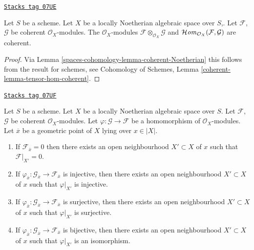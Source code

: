 \begin{lemma}
\label{spaces-cohomology-lemma-tensor-hom-coherent}
\href{https://stacks.math.columbia.edu/tag/07UE}{\texttt{Stacks tag 07UE}}

Let $S$ be a scheme.
Let $X$ be a locally Noetherian algebraic space over $S$,.
Let $\mathcal{F}$, $\mathcal{G}$ be coherent $\mathcal{O}_X$-modules.
The $\mathcal{O}_X$-modules $\mathcal{F} \otimes_{\mathcal{O}_X} \mathcal{G}$
and $\mathcal{H}\mathit{om}_{\mathcal{O}_X}(\mathcal{F}, \mathcal{G})$ are
coherent.
\end{lemma}

\begin{proof}
Via Lemma \ref{spaces-cohomology-lemma-coherent-Noetherian} this follows from the result
for schemes, see
Cohomology of Schemes, Lemma \ref{coherent-lemma-tensor-hom-coherent}.
\end{proof}

\begin{lemma}
\label{spaces-cohomology-lemma-local-isomorphism}
\href{https://stacks.math.columbia.edu/tag/07UF}{\texttt{Stacks tag 07UF}}

Let $S$ be a scheme. Let $X$ be a locally Noetherian algebraic space over $S$.
Let $\mathcal{F}$, $\mathcal{G}$ be coherent $\mathcal{O}_X$-modules.
Let $\varphi : \mathcal{G} \to \mathcal{F}$ be a homomorphism
of $\mathcal{O}_X$-modules. Let $\overline{x}$ be a geometric point of $X$
lying over $x \in |X|$.
\begin{enumerate}
\item If $\mathcal{F}_{\overline{x}} = 0$ then there exists an open
neighbourhood $X' \subset X$ of $x$ such that $\mathcal{F}|_{X'} = 0$.
\item If $\varphi_{\overline{x}} : \mathcal{G}_{\overline{x}} \to
\mathcal{F}_{\overline{x}}$ is injective, then there exists an open
neighbourhood $X' \subset X$ of $x$ such that $\varphi|_{X'}$ is injective.
\item If $\varphi_{\overline{x}} : \mathcal{G}_{\overline{x}} \to
\mathcal{F}_{\overline{x}}$ is surjective, then there exists an open
neighbourhood $X' \subset X$ of $x$ such that $\varphi|_{X'}$ is surjective.
\item If $\varphi_{\overline{x}} : \mathcal{G}_{\overline{x}} \to
\mathcal{F}_{\overline{x}}$ is bijective, then there exists an open
neighbourhood $X' \subset X$ of $x$ such that $\varphi|_{X'}$ is an isomorphism.
\end{enumerate}
\end{lemma}

